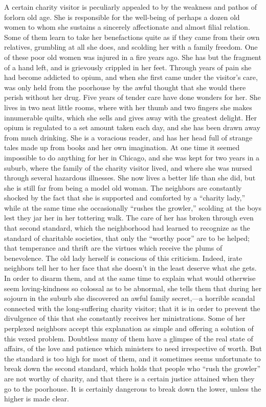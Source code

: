 \documentclass[]{article}
\begin{document}
\begin{sectionbody}
\addamsparagraph A certain charity visitor is peculiarly appealed to by the weakness and
pathos of forlorn old age. She is responsible for the well-being of
perhaps a dozen old women to whom she sustains a sincerely affectionate
and almost filial relation. Some of them learn to take her benefactions
quite as if they came from their own relatives, grumbling at all she
does, and scolding her with a family freedom. One of these poor old
women was injured in a fire years ago. She has but the fragment of a
hand left, and is grievously crippled in her feet. Through years of pain
she had become addicted to opium, and when she first came under the
visitor's care, was only held from the poorhouse by the awful thought
that she would there perish without her drug. Five years of tender care
have done wonders for her. She lives in two neat little rooms, where
with her thumb and two fingers she makes innumerable quilts, which she
sells and gives away with the greatest delight. Her opium is regulated
to a set amount taken each day, and she has been drawn away from much
drinking. She is a voracious reader, and has her head full of strange
tales made up from books and her own imagination. At one time it seemed
impossible to do anything for her in Chicago, and she was kept for two
years in a suburb, where the family of the charity visitor lived, and
where she was nursed through several hazardous illnesses. She now lives
a better life than she did, but she is still far from being a model old
woman. The neighbors are constantly shocked by the fact that she is
supported and comforted by a ``charity lady,'' while at the same time she
occasionally ``rushes the growler,'' scolding at the boys lest they jar
her in her tottering walk. The care of her has broken through even that
second standard, which the neighborhood had learned to recognize as the
standard of charitable societies, that only the ``worthy poor'' are to be
helped; that temperance and thrift are the virtues which receive the
plums of benevolence. The old lady herself is conscious of this
criticism. Indeed, irate neighbors tell her to her face that she doesn't
in the least deserve what she gets. In order to disarm them, and at the
same time to explain what would otherwise seem loving-kindness so
colossal as to be abnormal, she tells them that during her sojourn in
the suburb she discovered an awful family secret,---a horrible scandal
connected with the long-suffering charity visitor; that it is in order
to prevent the divulgence of this that she constantly receives her
ministrations. Some of her perplexed neighbors accept this explanation
as simple and offering a solution of this vexed problem. Doubtless many
of them have a glimpse of the real state of affairs, of the love and
patience which ministers to need irrespective of worth. But the
standard is too high for most of them, and it sometimes seems
unfortunate to break down the second standard, which holds that people
who ``rush the growler'' are not worthy of charity, and that there is a
certain justice attained when they go to the poorhouse. It is certainly
dangerous to break down the lower, unless the higher is made clear.


\end{sectionbody}
\end{document}
